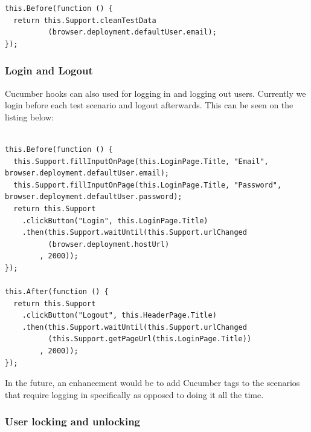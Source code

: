 \begin{listing}[H]
\begin{verbatim}
this.Before(function () {
  return this.Support.cleanTestData
          (browser.deployment.defaultUser.email);
});
\end{verbatim}
\label{lst:remove-test-data-before-scenario}
\end{listing}

\subsubsection{Login and Logout}
\label{subsubsec:login-and-logout}

Cucumber hooks can also used for logging in and logging out users. Currently we login before each test scenario and logout afterwards. This can be seen on the listing below:

\begin{listing}[H]
\begin{verbatim}

this.Before(function () {
  this.Support.fillInputOnPage(this.LoginPage.Title, "Email", browser.deployment.defaultUser.email);
  this.Support.fillInputOnPage(this.LoginPage.Title, "Password", browser.deployment.defaultUser.password);
  return this.Support
    .clickButton("Login", this.LoginPage.Title)
    .then(this.Support.waitUntil(this.Support.urlChanged
          (browser.deployment.hostUrl)
        , 2000));
});

this.After(function () {
  return this.Support
    .clickButton("Logout", this.HeaderPage.Title)
    .then(this.Support.waitUntil(this.Support.urlChanged
          (this.Support.getPageUrl(this.LoginPage.Title))
        , 2000));
});

\end{verbatim}
\label{lst:login-and-logout-hooks}
\end{listing}

In the future, an enhancement would be to add Cucumber tags to the scenarios that require logging in specifically as opposed to doing it all the time.

\subsubsection{User locking and unlocking}
\label{subsubsec:user-locking-and-unlocking}


